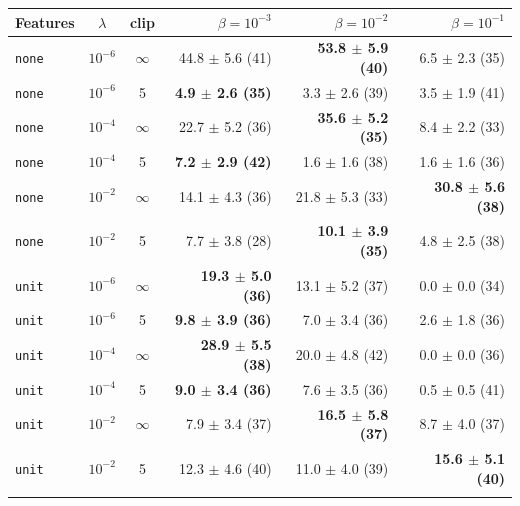 \begin{tabular}{@{}l c c r r r@{}}
\toprule
\textbf{Features} & \textbf{$\lambda$} & \textbf{clip} & \textbf{$\beta{=}10^{-3}$} & \textbf{$\beta{=}10^{-2}$} & \textbf{$\beta{=}10^{-1}$} \\
\midrule
\texttt{none} & $10^{-6}$ & $\infty$ & 44.8 $\pm$ 5.6 (41) & \textbf{53.8 $\pm$ 5.9 (40)} & 6.5 $\pm$ 2.3 (35) \\
\texttt{none} & $10^{-6}$ & 5 & \textbf{4.9 $\pm$ 2.6 (35)} & 3.3 $\pm$ 2.6 (39) & 3.5 $\pm$ 1.9 (41) \\
\addlinespace[2pt]
\texttt{none} & $10^{-4}$ & $\infty$ & 22.7 $\pm$ 5.2 (36) & \textbf{35.6 $\pm$ 5.2 (35)} & 8.4 $\pm$ 2.2 (33) \\
\texttt{none} & $10^{-4}$ & 5 & \textbf{7.2 $\pm$ 2.9 (42)} & 1.6 $\pm$ 1.6 (38) & 1.6 $\pm$ 1.6 (36) \\
\addlinespace[2pt]
\texttt{none} & $10^{-2}$ & $\infty$ & 14.1 $\pm$ 4.3 (36) & 21.8 $\pm$ 5.3 (33) & \textbf{30.8 $\pm$ 5.6 (38)} \\
\texttt{none} & $10^{-2}$ & 5 & 7.7 $\pm$ 3.8 (28) & \textbf{10.1 $\pm$ 3.9 (35)} & 4.8 $\pm$ 2.5 (38) \\
\addlinespace[2pt]
\texttt{unit} & $10^{-6}$ & $\infty$ & \textbf{19.3 $\pm$ 5.0 (36)} & 13.1 $\pm$ 5.2 (37) & 0.0 $\pm$ 0.0 (34) \\
\texttt{unit} & $10^{-6}$ & 5 & \textbf{9.8 $\pm$ 3.9 (36)} & 7.0 $\pm$ 3.4 (36) & 2.6 $\pm$ 1.8 (36) \\
\addlinespace[2pt]
\texttt{unit} & $10^{-4}$ & $\infty$ & \textbf{28.9 $\pm$ 5.5 (38)} & 20.0 $\pm$ 4.8 (42) & 0.0 $\pm$ 0.0 (36) \\
\texttt{unit} & $10^{-4}$ & 5 & \textbf{9.0 $\pm$ 3.4 (36)} & 7.6 $\pm$ 3.5 (36) & 0.5 $\pm$ 0.5 (41) \\
\addlinespace[2pt]
\texttt{unit} & $10^{-2}$ & $\infty$ & 7.9 $\pm$ 3.4 (37) & \textbf{16.5 $\pm$ 5.8 (37)} & 8.7 $\pm$ 4.0 (37) \\
\texttt{unit} & $10^{-2}$ & 5 & 12.3 $\pm$ 4.6 (40) & 11.0 $\pm$ 4.0 (39) & \textbf{15.6 $\pm$ 5.1 (40)} \\
\addlinespace[2pt]
\bottomrule
\end{tabular}
